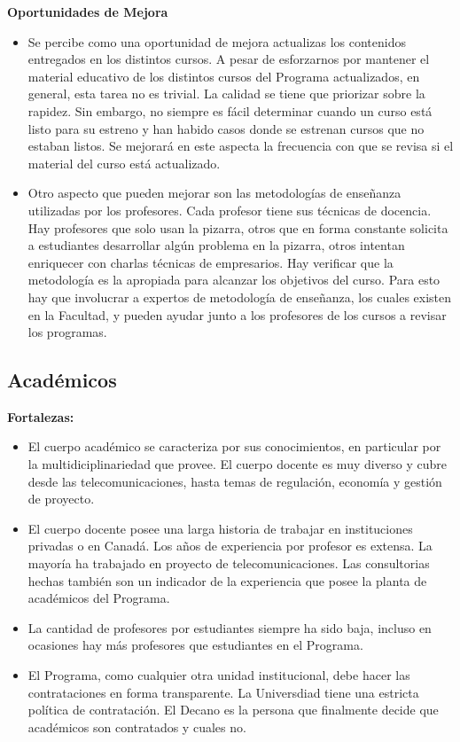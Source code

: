 \noindent\textbf{Oportunidades de Mejora}

\begin{itemize}
\item Se percibe como una oportunidad de mejora actualizas los contenidos entregados en los distintos cursos. A pesar de esforzarnos por mantener el material educativo de los distintos cursos del Programa actualizados, en general, esta tarea 
no es trivial. La calidad se tiene que priorizar sobre la rapidez. Sin embargo, no siempre es fácil determinar cuando un curso está listo para
su estreno y han habido casos donde se estrenan cursos que no estaban listos. Se mejorará en este aspecta la frecuencia con que se revisa si el material del curso está actualizado.
\item Otro aspecto que pueden mejorar son las metodologías de enseñanza utilizadas por los profesores. Cada profesor tiene sus técnicas de docencia. Hay profesores que solo usan la pizarra, otros que en forma constante solicita a estudiantes
desarrollar algún problema en la pizarra, otros intentan enriquecer con charlas técnicas de empresarios. Hay verificar que la metodología es la apropiada para alcanzar los objetivos del curso. Para esto hay que involucrar a expertos de metodología de enseñanza, los cuales existen en la Facultad, y pueden ayudar junto a los profesores de los cursos a revisar los programas.
\end{itemize}



\subsection{Académicos}

\noindent\textbf{Fortalezas:}

\begin{itemize}
\item El cuerpo académico se caracteriza por sus conocimientos, en particular por la multidiciplinariedad que provee. El cuerpo 
docente es muy diverso y cubre desde las telecomunicaciones, hasta temas de regulación, economía y gestión de proyecto.
\item El cuerpo docente posee una larga historia de trabajar en instituciones privadas o en Canadá. Los años de experiencia por 
profesor es extensa. La mayoría ha trabajado en proyecto de telecomunicaciones. Las consultorias hechas también son un indicador de la experiencia que posee la planta de académicos del Programa.
\item La cantidad de profesores por estudiantes siempre ha sido baja, incluso en ocasiones hay más profesores que estudiantes en el Programa.
\item El Programa, como cualquier otra unidad institucional, debe hacer las contrataciones en forma transparente. La Universdiad tiene una 
estricta política de contratación. El Decano es la persona que finalmente decide que académicos son contratados y cuales no.
\end{itemize}


